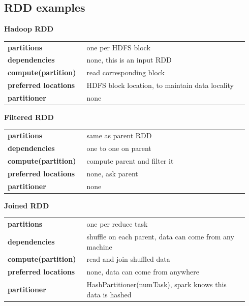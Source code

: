 	\subsection{RDD examples}
		\par\indent
		\par\textbf{Hadoop RDD}
		\begin{table}[H]
			\centering
			\begin{tabular}{p{0.3\linewidth}p{0.64\linewidth}}
				\textbf{partitions} & one per HDFS block \\
				\textbf{dependencies} & none, this is an input RDD \\
				\textbf{compute(partition)} & read corresponding block \\
				\textbf{preferred locations} & HDFS block location, to maintain data locality \\
				\textbf{partitioner} & none \\
			\end{tabular}
		\end{table}
		\par
		\textbf{Filtered RDD}
		\begin{table}[H]
			\centering
			\begin{tabular}{p{0.3\linewidth}p{0.64\linewidth}}
				\textbf{partitions} & same as parent RDD \\
				\textbf{dependencies} & one to one on parent \\
				\textbf{compute(partition)} & compute parent and filter it \\
				\textbf{preferred locations} & none, ask parent \\
				\textbf{partitioner} & none \\
			\end{tabular}
		\end{table}
		\par
		\textbf{Joined RDD}
		\begin{table}[H]
		\centering
		\begin{tabular}{p{0.3\linewidth}p{0.64\linewidth}}
			\textbf{partitions} & one per reduce task \\
			\textbf{dependencies} & shuffle on each parent, data can come from any machine \\
			\textbf{compute(partition)} & read and join shuffled data \\
			\textbf{preferred locations} & none, data can come from anywhere \\
			\textbf{partitioner} & HashPartitioner(numTask), spark knows this data is hashed \\
		\end{tabular}
		\end{table}
